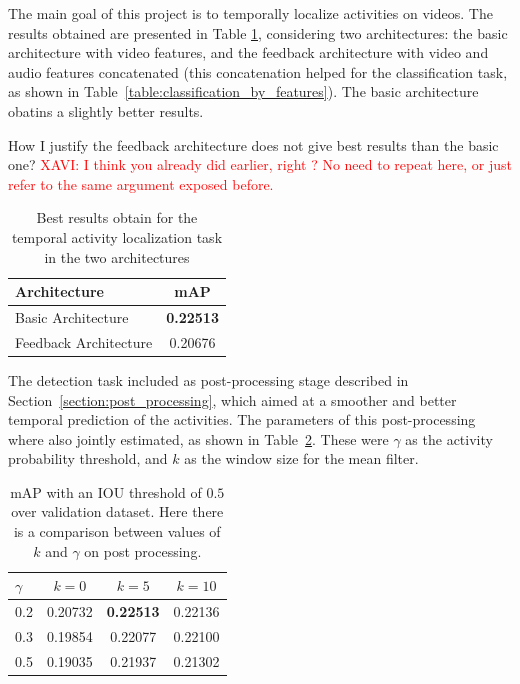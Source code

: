 The main goal of this project is to temporally localize activities on videos. The results obtained are presented in Table \ref{table:detection_architecture_comparison}, considering two architectures: the basic architecture with video features, and the feedback architecture with video and audio features concatenated (this concatenation helped for the classification task, as shown in Table~\ref{table:classification_by_features}).
The basic architecture obatins a slightly better results. 

How I justify the feedback architecture does not give best results than the basic one?
\textcolor{red}{XAVI: I think you already did earlier, right ? No need to repeat here, or just refer to the same argument exposed before.}

\begin{table}[H]
\begin{center}
\begin{tabular}{|l|c|}
\hline
Architecture & mAP \\
\hline\hline
Basic Architecture & \bf0.22513 \\
Feedback Architecture & 0.20676 \\
\hline
\end{tabular}
\end{center}
\caption{Best results obtain for the temporal activity localization task in the two architectures}
\label{table:detection_architecture_comparison}
\end{table}

The detection task included as post-processing stage described in Section~\ref{section:post_processing}, which aimed at a smoother and better temporal prediction of the activities. 
The parameters of this post-processing where also jointly estimated, as shown in Table~\ref{table:detection_postprocessing_comparison}.
These were $\gamma$ as the activity probability threshold, and $k$ as the window size for the mean filter.

\begin{table}[H]
\begin{center}
\begin{tabular}{|l|c|c|c|}
\hline
$\gamma$ & $k=0$ & $k=5$ & $k=10$ \\
\hline
0.2 & 0.20732 & \bf0.22513 & 0.22136 \\
0.3 & 0.19854 & 0.22077 & 0.22100 \\
0.5 & 0.19035 & 0.21937 & 0.21302 \\
\hline
\end{tabular}
\end{center}
\caption{mAP with an IOU threshold of $0.5$ over validation dataset. Here there is a comparison
between values of $k$ and $\gamma$ on post processing.}
\label{table:detection_postprocessing_comparison}
\end{table}

